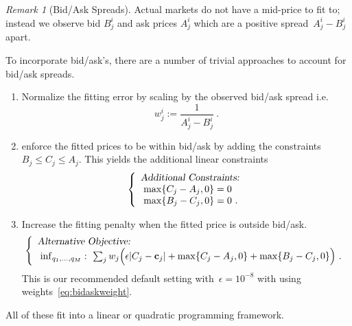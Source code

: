 \documentclass[twoside]{article}
\theoremstyle{plain}
\theoremstyle{definition}
\theoremstyle{remark}
\newtheorem{remark}[theorem]{Remark}
\begin{document}
\begin{remark}[Bid/Ask Spreads]
    Actual markets do not have a mid-price to fit to; instead we observe bid $B_j^i$ and
    ask prices $A_j^i$ which are a positive spread~$A_j^i - B_j^i$ apart.

    To incorporate bid/ask's, there are a number of trivial approaches to account for bid/ask spreads.
    \begin{enumerate}
        \item Normalize the fitting error by scaling by the observed bid/ask spread i.e.
        \begin{equation}\label{eq:bidaskweight}
            w^i_j := \frac1{ A^i_j - B^i_j } \ .
        \end{equation}
        
        \item enforce the fitted prices to be within bid/ask by adding the constraints $B_j \leq C_j \leq A_j$. This yields the additional linear constraints
        $$
        \left\{
            \begin{array}{lll}
            \mbox{\textsl{Additional Constraints:}} \\
            \hspace{0.1cm}\max\{ C_j - A_j, 0 \} = 0 \\
            \hspace{0.1cm}\max\{ B_j - C_j, 0 \} = 0 \ . \\
            \end{array}\right.
        $$

        
        \item Increase the fitting penalty when the fitted price is outside bid/ask.
        $$
        \left\{
            \begin{array}{lll}
            \mbox{\textsl{Alternative Objective:}} \\
             \hspace{0.1cm}\inf_{q_1,\ldots,q_M}:\ \sum_j  w_j \Big( 
                \epsilon | C_j - \mathbf{c}_j | + \max\{ C_j - A_j, 0 \} + \max\{ B_j - C_j, 0 \} \Big) \ .
            \end{array}\right.
        $$
        This is our recommended default setting with~$\epsilon=10^{-8}$ with
        using weights~\eqref{eq:bidaskweight}.
        \end{enumerate}
    All of these fit into a linear or quadratic programming framework. 
\end{remark}
\end{document}
